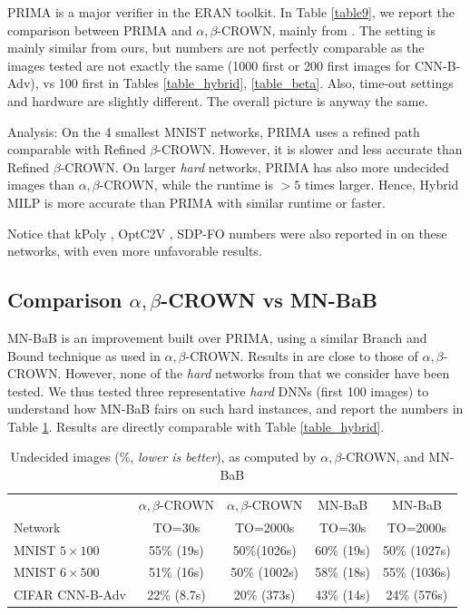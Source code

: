 	PRIMA \cite{prima} is a major verifier in the ERAN toolkit. In Table \ref{table9}, we report the comparison between PRIMA and $\alpha,\beta$-CROWN, mainly from \cite{crown}. The setting is mainly similar from ours, but numbers are not perfectly comparable as the images tested are not  exactly the same (1000 first or 200 first images for CNN-B-Adv), vs 100 first in Tables \ref{table_hybrid}, \ref{table_beta}. Also, time-out settings and hardware are slightly different. The overall picture is anyway the same.


Analysis: On the 4 smallest MNIST networks, PRIMA uses a refined path comparable with Refined $\beta$-CROWN. However, it is slower and less accurate than Refined $\beta$-CROWN.
On larger {\em hard} networks, PRIMA has also more undecided images than $\alpha,\beta$-CROWN, while the runtime is $>5$ times larger.
Hence, Hybrid MILP is more accurate than PRIMA with similar runtime or faster.

Notice that kPoly \cite{kpoly}, OptC2V \cite{optC2V}, SDP-FO \cite{SDPFI} numbers were also reported in \cite{crown} on these networks, with even more unfavorable results.

\subsection*{Comparison $\alpha,\beta$-CROWN vs MN-BaB}

MN-BaB \cite{ferrari2022complete} is an improvement built over PRIMA, using a similar Branch and Bound technique as used in $\alpha,\beta$-CROWN. Results in \cite{ferrari2022complete}
are close to those of $\alpha,\beta$-CROWN. However, none of the {\em hard} networks from \cite{crown} that we consider have been tested. We thus tested three representative {\em hard} DNNs (first 100 images) to understand how MN-BaB fairs on such hard instances, and report the numbers in Table \ref{table10}. Results are directly comparable with Table \ref{table_hybrid}.


\begin{table}[h!]
	\centering
		\caption{Undecided images ($\%$, {\em lower is better}), as computed by $\alpha,\beta$-CROWN, and MN-BaB}
	\begin{tabular}{||l||c|c||c|c||}
		\hline \hline
		 & $\alpha,\beta$-CROWN & $\alpha,\beta$-CROWN & MN-BaB & MN-BaB \\ 
		 Network & TO=30s & TO=2000s &  TO=30s & TO=2000s \\ 
		\hline
		MNIST $5 \times 100$ & 55\% (19s) & 50\%(1026s) & 60\% (19s) & 50\% (1027s) \\ \hline
		MNIST $6 \times 500$ & 51\% (16s) & 50\% (1002s) & 58\% (18s) & 55\% (1036s) \\ \hline
		CIFAR CNN-B-Adv & 22\% (8.7s) & 20\% (373s) & 43\% (14s) & 24\% (576s) \\ \hline 
	\end{tabular}
	\label{table10}
\end{table}

